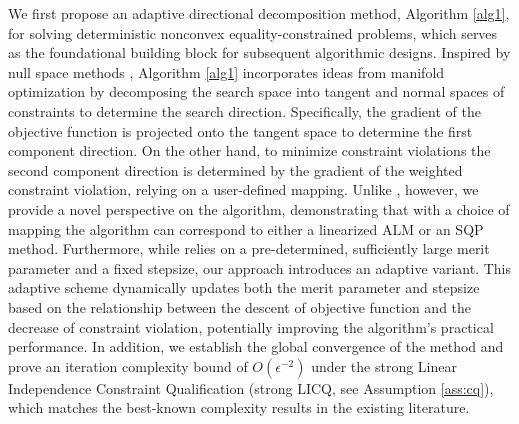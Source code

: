 \documentclass[11pt]{article}
\begin{document}
{We first propose an adaptive directional decomposition method, Algorithm \ref{alg1}, for solving deterministic nonconvex equality-constrained problems, which serves as the foundational building block for subsequent algorithmic designs.}
Inspired by null space methods \cite{nocedal2006numerical,schechtman2023orthogonal}, Algorithm \ref{alg1} incorporates ideas from manifold optimization by {decomposing the search space into tangent and normal spaces of constraints to determine the search  direction. Specifically,   the gradient of the objective function is projected onto the tangent space to determine the first component direction. On the other hand, to minimize constraint violations the second component direction is determined by the gradient of the weighted  constraint violation, relying on a user-defined mapping.} Unlike \cite{schechtman2023orthogonal}, however,  we provide a novel perspective on the algorithm, demonstrating that with a   choice of mapping the algorithm can correspond to either a linearized ALM or an SQP method. Furthermore, while \cite{schechtman2023orthogonal} relies on a pre-determined, sufficiently large merit parameter and a fixed stepsize, our approach introduces an adaptive variant. This adaptive scheme dynamically updates both the merit parameter and stepsize based on the relationship between the descent of objective function  and the decrease of constraint violation, potentially improving the algorithm's practical  performance. In addition, we establish the global convergence of the method and prove an iteration complexity bound of $O(\epsilon^{-2})$ under the strong Linear Independence Constraint Qualification (strong LICQ, see Assumption \ref{ass:cq}), which matches the best-known complexity results in the existing literature.
\end{document}
